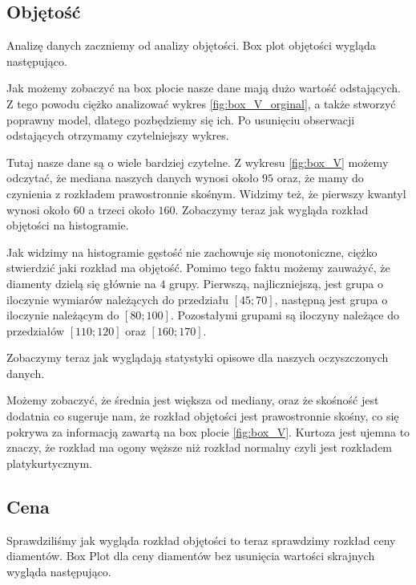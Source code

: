 \documentclass[12pt]{article}
\theoremstyle{exer}
\begin{document}
	\subsection{Objętość}
	Analizę danych zaczniemy od analizy objętości. Box plot objętości wygląda następująco.

	Jak możemy zobaczyć na box plocie nasze dane mają dużo wartość odstających. Z tego powodu ciężko analizować wykres \ref{fig:box_V_orginal}, a także stworzyć poprawny model, dlatego pozbędziemy się ich. Po usunięciu obserwacji odstających otrzymamy czytelniejszy wykres.

	Tutaj nasze dane są o wiele bardziej czytelne. Z wykresu \ref{fig:box_V} możemy odczytać, że mediana naszych danych wynosi około $95$ oraz, że mamy do czynienia z rozkładem prawostronnie skośnym. Widzimy też, że pierwszy kwantyl wynosi około $60$ a trzeci około $160$.
	Zobaczymy teraz jak wygląda rozkład objętości na histogramie.

	Jak widzimy na histogramie gęstość nie zachowuje się monotoniczne, ciężko stwierdzić jaki rozkład ma objętość. Pomimo tego faktu możemy zauważyć, że diamenty dzielą się głównie na $4$ grupy. Pierwszą, najliczniejszą, jest grupa o iloczynie wymiarów należących do przedziału $[45;70] $, następną jest grupa o iloczynie należącym do $[80;100]$. Pozostałymi grupami są iloczyny należące do przedziałów $[110;120]$ oraz $[160;170]$.
	
	Zobaczymy teraz jak wyglądają statystyki opisowe dla naszych oczyszczonych danych.
	
	\begin{table}[H]
		\caption{Podstawowe statystyki opisowe dla objętości.}
		\label{tab:statystyki_V}
	\end{table}
	Możemy zobaczyć, że średnia jest większa  od mediany, oraz że skośność jest dodatnia co sugeruje nam, że rozkład objętości jest prawostronnie skośny, co się pokrywa za informacją zawartą na box plocie \ref{fig:box_V}. Kurtoza jest ujemna to znaczy, że rozkład ma ogony węższe niż rozkład normalny czyli jest rozkładem platykurtycznym. 
	
	\subsection{Cena}
	Sprawdziliśmy jak wygląda rozkład objętości to teraz sprawdzimy rozkład ceny diamentów.
	Box Plot dla ceny diamentów bez usunięcia wartości skrajnych wygląda następująco.
	
\end{document}
